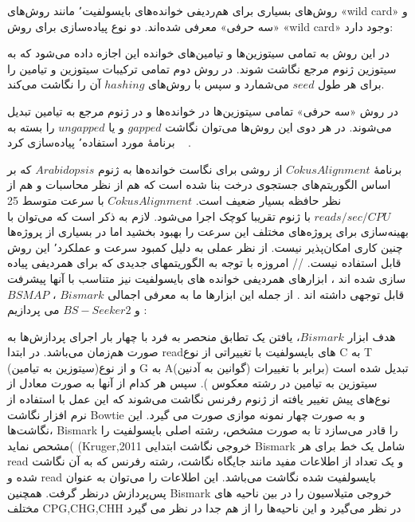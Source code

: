 

روش‌های بسیاری برای هم‌ردیفی خوانده‌های بایسولفیت٬ مانند روش‌های «wild card» و «سه حرفی» معرفی شده‌اند. دو نوع پیاده‌سازی برای روش «wild card» وجود دارد:

 در این روش به تمامی سیتوزین‌ها و تیامین‌های خوانده این اجازه داده می‌شود که به سیتوزین ژنوم مرجع نگاشت شوند.
 در روش دوم تمامی ترکیبات سیتوزین و تیامین را برای هر طول $seed$ می‌شمارد و سپس با روش‌های $hashing$ آن را نگاشت می‌کند.

در روش «سه حرفی» تمامی سیتوزین‌ها در خوانده‌ها و در ژنوم مرجع به تیامین تبدیل می‌شوند. در هر دوی این روش‌ها می‌توان نگاشت $gapped$ و یا $ungapped$ را بسته به برنامهٔ مورد استفاده٬ پیاده‌سازی کرد
~\cite{kunde2014comparison}
.

برنامهٔ $CokusAlignment$  از روشی برای نگاست خوانده‌ها به ژنوم $Arabidopsis$ که بر اساس الگوریتم‌های جستجوی درخت بنا شده است که هم از نظر محاسبات و هم از نظر حافظه بسیار ضعیف است. $CokusAlignment$ با سرعت متوسط 25 $reads/sec/CPU$ با ژنوم تقریبا کوچک اجرا می‌شود. لازم به ذکر است که می‌توان با بهینه‌سازی برای پروژه‌های مختلف این سرعت را بهبود بخشید اما در بسیاری از پروژه‌ها چنین کاری امکان‌پذیر نیست. از نظر عملی به دلیل کمبود سرعت و عملکرد٬ این روش قابل استفاده نیست.
//
امروزه با توجه به الگوریتمهای جدیدی که برای همردیفی پیاده سازی شده اند ، ابزارهای همردیفی  خوانده های بایسولفیت نیز متناسب با آنها پیشرفت قابل توجهی داشته اند . از جمله این ابزارها ما به معرفی اجمالی $Bismark$ ، $BSMAP$ و $BS-Seeker2$ می پردازیم :

هدف ابزار $Bismark$، یافتن یک تطابق منحصر به فرد با چهار بار اجرای پردازش‌ها به صورت هم‌زمان می‌باشد. در ابتدا readهای بایسولفیت با تغییراتی از نوع C  به T (سیتوزین به تیامین)و از نوع G به  A(گوانین به آدنین) تبدیل شده است (برابر با تغییرات  سیتوزین به تیامین در رشته معکوس ). سپس هر کدام از آنها به صورت معادل از نوع‌های پیش تغییر یافته از ژنوم رفرنس نگاشت می‌شوند که این عمل با استفاده از نرم افزار نگاشت Bowtie و به صورت چهار نمونه موازی صورت می گیرد. این نگاشت‌ها، Bismark را قادر می‌سازد تا به صورت مشخص، رشته اصلی بایسولفیت را مشحص نماید( (Kruger,2011
خروجی نگاشت ابتدایی Bismark شامل یک خط برای هر read و یک تعداد از اطلاعات مفید مانند جایگاه نگاشت، رشته رفرنس که به آن نگاشت شده و read بایسولفیت شده نگاشت می‌باشد. این اطلاعات را می‌توان به عنوان پس‌پردازش درنظر گرفت. همچنین Bismark خروجی متیلاسیون را در بین ناحیه های مختلف CPG,CHG,CHH  در نظر می‌گیرد و این ناحیه‌ها را از هم جدا در نظر می گیرد


